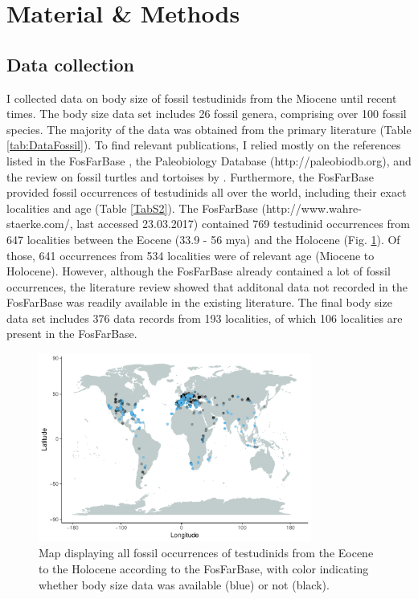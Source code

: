 \section{Material \& Methods}

\subsection{Data collection}
I collected data on body size of fossil testudinids from the Miocene until recent times. The body size data set includes 26 fossil genera, comprising over 100 fossil species. The majority of the data was obtained from the primary literature (Table \ref{tab:DataFossil}). To find relevant publications, I relied mostly on the references listed in the FosFarBase \citep{Bohme2003b}, the Paleobiology Database (http://paleobiodb.org), and the review on fossil turtles and tortoises by \cite{rhodin2015turtles}.
Furthermore, the FosFarBase provided fossil occurrences of testudinids all over the world, including their exact localities and age (Table \ref{TabS2}). The FosFarBase (http://www.wahre-staerke.com/, last accessed 23.03.2017) contained 769 testudinid occurrences from 647 localities between the Eocene (33.9 - 56 mya) and the Holocene (Fig. \ref{fig:mapOc}). Of those, 641 occurrences from 534 localities were of relevant age (Miocene to Holocene). However, although the FosFarBase already contained a lot of fossil occurrences, the literature review showed that additonal data not recorded in the FosFarBase was readily available in the existing literature. 
The final body size data set includes 376 data records from 193 localities, of which 106 localities are present in the FosFarBase.


 \begin{figure}[htbp]
 	\centering
 	\includegraphics[width=0.8\textwidth]{MA_JJ_files/figure-latex/MapFossilOccurrences-1.pdf}
 	\caption[Map: fossil occurences]{Map displaying all fossil occurrences of testudinids from the Eocene to the Holocene according to the FosFarBase, with
 		color indicating whether body size data was available (blue) or not (black).}
 	\label{fig:mapOc}
 \end{figure}

